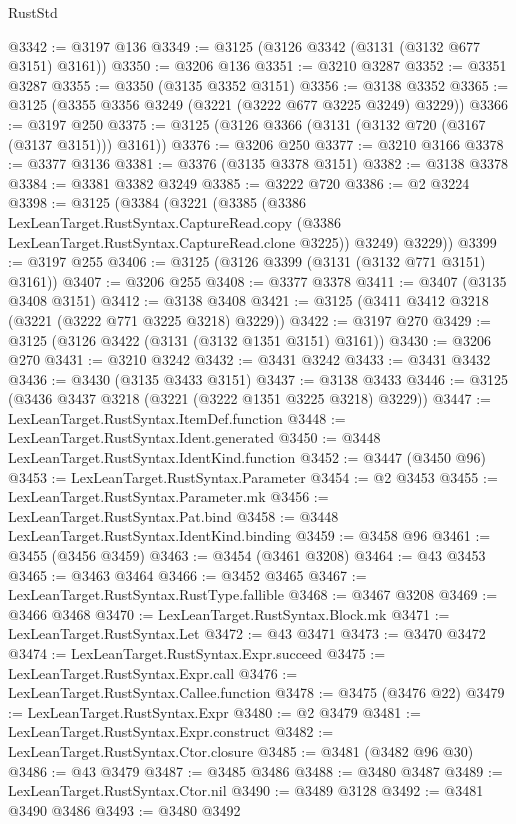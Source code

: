 \begin{lexlean}{RustStd}
\begin{coremodule}
{\begin{coremodule}
{{{{{{{{{{{{{{{{{{{{{{{{{{{{{{{{{{{{{{{{{{{{{@3342 := @3197 @136
@3349 := @3125 (@3126 @3342 (@3131 (@3132 @677 @3151) @3161))
@3350 := @3206 @136
@3351 := @3210 @3287
@3352 := @3351 @3287
@3355 := @3350 (@3135 @3352 @3151)
@3356 := @3138 @3352
@3365 := @3125 (@3355 @3356 @3249 (@3221 (@3222 @677 @3225 @3249) @3229))
@3366 := @3197 @250
@3375 := @3125 (@3126 @3366 (@3131 (@3132 @720 (@3167 (@3137 @3151))) @3161))
@3376 := @3206 @250
@3377 := @3210 @3166
@3378 := @3377 @3136
@3381 := @3376 (@3135 @3378 @3151)
@3382 := @3138 @3378
@3384 := @3381 @3382 @3249
@3385 := @3222 @720
@3386 := @2 @3224
@3398 := @3125
    (@3384
      (@3221
        (@3385
          (@3386
            LexLeanTarget.RustSyntax.CaptureRead.copy
            (@3386 LexLeanTarget.RustSyntax.CaptureRead.clone @3225))
          @3249)
        @3229))
@3399 := @3197 @255
@3406 := @3125 (@3126 @3399 (@3131 (@3132 @771 @3151) @3161))
@3407 := @3206 @255
@3408 := @3377 @3378
@3411 := @3407 (@3135 @3408 @3151)
@3412 := @3138 @3408
@3421 := @3125 (@3411 @3412 @3218 (@3221 (@3222 @771 @3225 @3218) @3229))
@3422 := @3197 @270
@3429 := @3125 (@3126 @3422 (@3131 (@3132 @1351 @3151) @3161))
@3430 := @3206 @270
@3431 := @3210 @3242
@3432 := @3431 @3242
@3433 := @3431 @3432
@3436 := @3430 (@3135 @3433 @3151)
@3437 := @3138 @3433
@3446 := @3125 (@3436 @3437 @3218 (@3221 (@3222 @1351 @3225 @3218) @3229))
@3447 := LexLeanTarget.RustSyntax.ItemDef.function
@3448 := LexLeanTarget.RustSyntax.Ident.generated
@3450 := @3448 LexLeanTarget.RustSyntax.IdentKind.function
@3452 := @3447 (@3450 @96)
@3453 := LexLeanTarget.RustSyntax.Parameter
@3454 := @2 @3453
@3455 := LexLeanTarget.RustSyntax.Parameter.mk
@3456 := LexLeanTarget.RustSyntax.Pat.bind
@3458 := @3448 LexLeanTarget.RustSyntax.IdentKind.binding
@3459 := @3458 @96
@3461 := @3455 (@3456 @3459)
@3463 := @3454 (@3461 @3208)
@3464 := @43 @3453
@3465 := @3463 @3464
@3466 := @3452 @3465
@3467 := LexLeanTarget.RustSyntax.RustType.fallible
@3468 := @3467 @3208
@3469 := @3466 @3468
@3470 := LexLeanTarget.RustSyntax.Block.mk
@3471 := LexLeanTarget.RustSyntax.Let
@3472 := @43 @3471
@3473 := @3470 @3472
@3474 := LexLeanTarget.RustSyntax.Expr.succeed
@3475 := LexLeanTarget.RustSyntax.Expr.call
@3476 := LexLeanTarget.RustSyntax.Callee.function
@3478 := @3475 (@3476 @22)
@3479 := LexLeanTarget.RustSyntax.Expr
@3480 := @2 @3479
@3481 := LexLeanTarget.RustSyntax.Expr.construct
@3482 := LexLeanTarget.RustSyntax.Ctor.closure
@3485 := @3481 (@3482 @96 @30)
@3486 := @43 @3479
@3487 := @3485 @3486
@3488 := @3480 @3487
@3489 := LexLeanTarget.RustSyntax.Ctor.nil
@3490 := @3489 @3128
@3492 := @3481 @3490 @3486
@3493 := @3480 @3492
}}}}}}}}}}}}}}}}}}}}}}}}}}}}}}}}}}}}}}}}}}}}}
\end{coremodule}}
\end{coremodule}
\end{lexlean}
